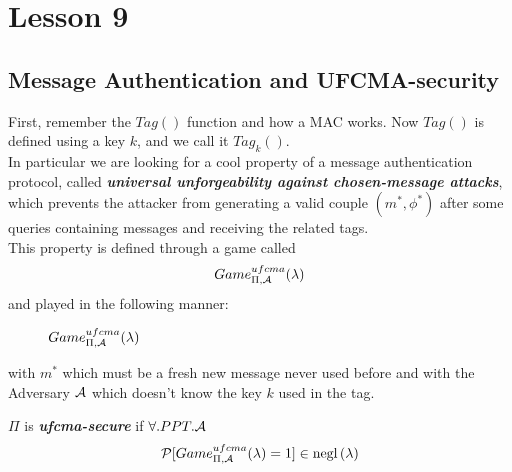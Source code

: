 \chapter*{Lesson 9}
\section{Message Authentication and UFCMA-security}
First, remember the $Tag()$ function and how a MAC works.
Now $Tag()$ is defined using a key $k$, and we call it $Tag_{k}()$.\\
In particular we are looking for a cool property of a message authentication
protocol, called \textbf{ \textit{universal unforgeability against
chosen-message attacks}}, which prevents the attacker from generating a valid
couple $(m^{*}, \phi^{*})$ after some queries containing messages and receiving
the related tags.\\

This property is defined through a game called 
\[
    Game_{\Pi, \mathcal{A}}^{ufcma}(\lambda)
\]
and played in the following manner:

\begin{figure}[h!]
   \centering
   \sdinit{}
   \caption{$Game_{\Pi, \mathcal{A}}^{ufcma}(\lambda)$}
\end{figure}

with $m^{*}$ which must be a fresh new message never used before and with the
Adversary $\mathcal{A}$ which doesn't know the key $k$ used in the tag.\\

\begin{definition}
    $\Pi$ is \textbf{ \textit{ufcma-secure} } if $ \forall.PPT.\mathcal{A}$ 
    \[
        \mathcal{P} [ Game_{\Pi, \mathcal{A}}^{ufcma}(\lambda)=1 ] \in \mathrm{negl}\left({\lambda}\right)  
    \]
\end{definition}

